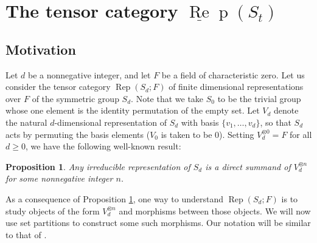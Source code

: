 \documentclass{amsart}
\newtheorem{proposition}[theorem]{Proposition}
\theoremstyle{definition}
\newtheorem{remark}[theorem]{Remark}
\def\uRep{\underline{\operatorname{Re}}\!\operatorname{p}}
\newcommand{\Rep}{\operatorname{Rep}}
\renewcommand{\1}{_{(1)}}
\renewcommand{\2}{_{(2)}}
\newcommand{\3}{_{(3)}}
\newcommand{\4}{_{(4)}}
\newcommand{\Z}{\mathbb{Z}}
\begin{document}
\section{The tensor category $\uRep(S_t)$}

\subsection{Motivation}\label{motivation}

Let $d$ be a nonnegative integer, and let $F$ be a field of characteristic zero.  
Let us consider the tensor category $\Rep(S_d; F)$ of finite dimensional representations over $ F$ of the symmetric group $S_d$.  Note that we take $S_0$ to be the trivial group whose one element is the identity permutation of the empty set.  Let $V_d$ denote the natural $d$-dimensional representation of $S_d$ with basis $\{v_1,\ldots, v_d\}$, so that $S_d$ acts by permuting the basis elements ($V_0$ is taken to be 0).    Setting $V_d^{\otimes 0}=F$ for all $d\geq 0$, we have the following well-known result:


\begin{proposition}\label{full} Any irreducible representation of $S_d$ is a direct summand of $V_d^{\otimes n}$ for some nonnegative integer $n$.
\end{proposition}



As a consequence of Proposition \ref{full}, one way to understand $ \Rep(S_d; F)$ is to study objects of the form $V^{\otimes n}_d$ and morphisms between those objects.  We will now use set partitions to construct some such morphisms.  Our notation will be similar to that of \cite{MR2143201}.
\end{document}

